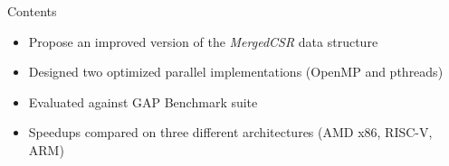 \begin{frame}{Contents}
\begin{itemize}
    \item<1-> Propose an improved version of the \textit{MergedCSR} data structure 
    \item<2-> Designed two optimized parallel implementations (OpenMP and pthreads)
    \pause
    \item<3-> Evaluated against GAP Benchmark suite
    \item<3-> Speedups compared on three different architectures (AMD x86, RISC-V, ARM)
\end{itemize}
\end{frame}